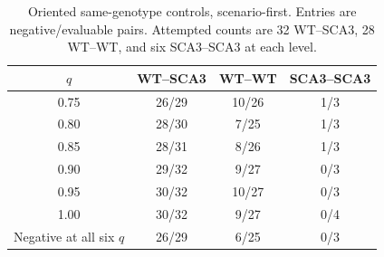 \begin{table}[htbp]\centering\small
\caption{Oriented same-genotype controls, scenario-first. Entries are negative/evaluable pairs. Attempted counts are 32 WT--SCA3, 28 WT--WT, and six SCA3--SCA3 at each level.}\label{tab:null}
\begin{tabular}{@{}cccc@{}}\toprule $q$&WT--SCA3&WT--WT&SCA3--SCA3\\\midrule
0.75&26/29&10/26&1/3\\
0.80&28/30&7/25&1/3\\
0.85&28/31&8/26&1/3\\
0.90&29/32&9/27&0/3\\
0.95&30/32&10/27&0/3\\
1.00&30/32&9/27&0/4\\
\midrule Negative at all six $q$&26/29&6/25&0/3\\\bottomrule\end{tabular}\end{table}
